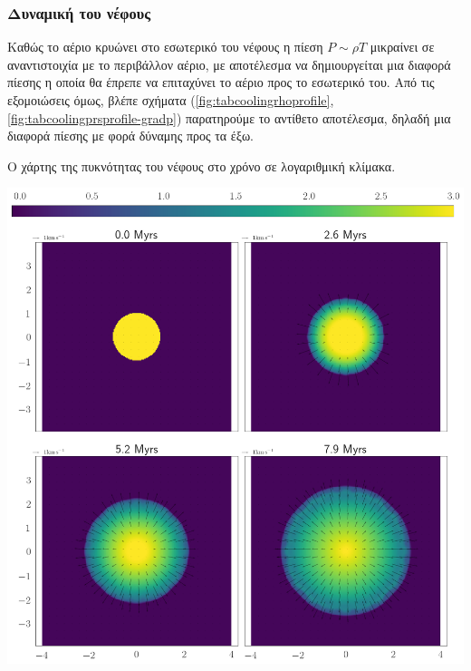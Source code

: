 \documentclass[article,a4paper,11.2pt]{memoir}
\numberwithin{equation}{subsection}
\begin{document}
	
	\subsubsection{Δυναμική του νέφους}
	Καθώς το αέριο κρυώνει στο εσωτερικό του νέφους η πίεση $P \sim \rho T$ μικραίνει σε αναντιστοιχία με το περιβάλλον αέριο, με αποτέλεσμα να δημιουργείται μια διαφορά πίεσης η οποία θα έπρεπε να επιταχύνει το αέριο προς το εσωτερικό του. Από τις εξομοιώσεις όμως, βλέπε σχήματα (\ref{fig:tabcoolingrhoprofile},\ref{fig:tabcoolingprsprofile-gradp}) παρατηρούμε το αντίθετο αποτέλεσμα, δηλαδή μια διαφορά πίεσης με φορά δύναμης προς τα έξω. 
	
	\begin{marginfigure}
		\caption{Ο χάρτης της πυκνότητας του νέφους στο χρόνο σε λογαριθμική κλίμακα.}
		\includegraphics[width=1.0\linewidth]{DataImages/TabCoolingRHOquad}
		\label{fig:TabCoolingRHOquad}
	\end{marginfigure}
	
\end{document}
